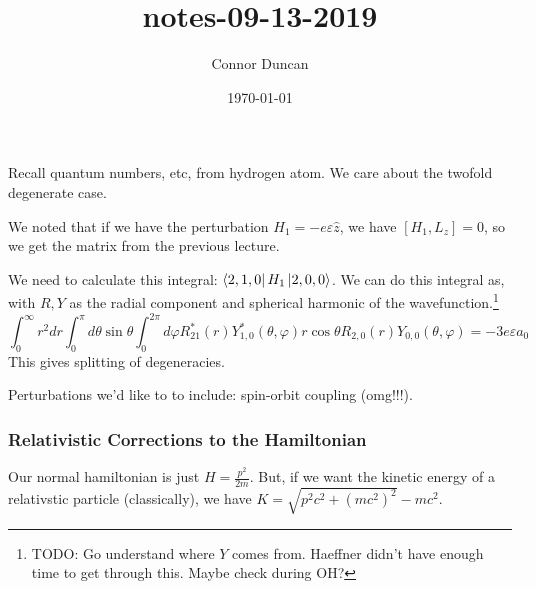 \documentclass{article}
\author{Connor Duncan}
\date{\today}
\title{notes-09-13-2019}
\theoremstyle{definition}
\begin{document}


Recall quantum numbers, etc, from hydrogen atom. We care about the twofold degenerate case.

We noted that if we have the perturbation $H_1=-e\varepsilon\hat z$, we have $[H_1,L_z]=0$, so we get the matrix from the previous lecture.

We need to calculate this integral: $\bra{2,1,0}H_1\ket{2,0,0}$. We can do this integral as, with $R,Y$ as the radial component and spherical harmonic of the wavefunction.\footnote{TODO: Go understand where $Y$ comes from. Haeffner didn't have enough time to get through this. Maybe check during OH?}
\begin{equation}
	\int_0^\infty r^2dr\int_0^\pi d\theta\sin\theta\int_0^{2\pi}d\varphi R^*_{21}(r)Y^*_{1,0}(\theta,\varphi)r\cos\theta R_{2,0}(r)Y_{0,0}(\theta,\varphi)=-3e\varepsilon a_0
\end{equation}
This gives splitting of degeneracies.

Perturbations we'd like to to include: spin-orbit coupling (omg!!!).

\subsubsection{Relativistic Corrections to the Hamiltonian}
Our normal hamiltonian is just $H=\frac{p^2}{2m}$. But, if we want the kinetic energy of a relativstic particle (classically), we have $K=\sqrt{p^2c^2+(mc^2)^2}-mc^2$.
\end{document}
